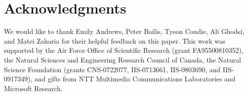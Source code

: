 \section*{Acknowledgments}
We would like to thank Emily Andrews, Peter Bailis, Tyson Condie, Ali Ghodsi,
and Matei Zaharia for their helpful feedback on this paper.  This work was
supported by the Air Force Office of Scientific Research (grant FA95500810352),
the Natural Sciences and Engineering Research Council of Canada, the Natural
Science Foundation (grants CNS-0722077, IIS-0713661, IIS-0803690, and
IIS-0917349), and gifts from NTT Multimedia Communications Laboratories and
Microsoft Research.
